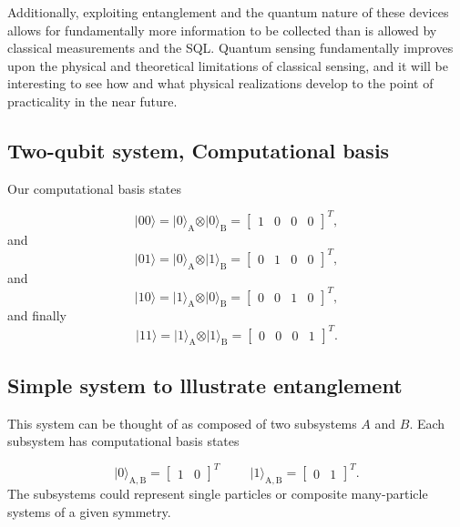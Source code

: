 \documentclass[%
oneside,                 %
final,                   %
10pt]{article}
\begin{document}
Additionally, exploiting entanglement and the quantum nature of these
devices allows for fundamentally more information to be collected than
is allowed by classical measurements and the SQL. Quantum sensing
fundamentally improves upon the physical and theoretical limitations
of classical sensing, and it will be interesting to see how and what
physical realizations develop to the point of practicality in the near
future.

\subsection{Two-qubit system, Computational basis}

Our computational basis states

\[
\vert 00\rangle = \vert 0\rangle_{\mathrm{A}}\otimes \vert 0\rangle_{\mathrm{B}}=\begin{bmatrix} 1 & 0 & 0 &0\end{bmatrix}^T,
\]
and
\[
\vert 01\rangle = \vert 0\rangle_{\mathrm{A}}\otimes \vert 1\rangle_{\mathrm{B}}=\begin{bmatrix} 0 & 1 & 0 &0\end{bmatrix}^T,
\]
and
\[
\vert 10\rangle = \vert 1\rangle_{\mathrm{A}}\otimes \vert 0\rangle_{\mathrm{B}}=\begin{bmatrix} 0 & 0 & 1 &0\end{bmatrix}^T,
\]
and finally
\[
\vert 11\rangle = \vert 1\rangle_{\mathrm{A}}\otimes \vert 1\rangle_{\mathrm{B}}=\begin{bmatrix} 0 & 0 & 0 &1\end{bmatrix}^T.
\]

\subsection{Simple system to lllustrate entanglement}

This system can be thought of as composed of two subsystems
$A$ and $B$. Each subsystem has computational basis states

\[
\vert 0\rangle_{\mathrm{A,B}}=\begin{bmatrix} 1 & 0\end{bmatrix}^T \hspace{1cm} \vert 1\rangle_{\mathrm{A,B}}=\begin{bmatrix} 0 & 1\end{bmatrix}^T.
\]
The subsystems could represent single particles or composite many-particle systems of a given symmetry.
\end{document}
